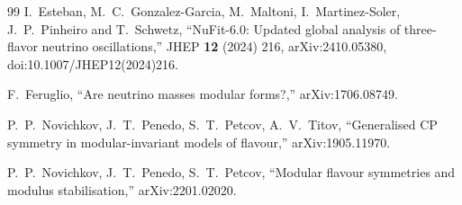 \documentclass[11pt,a4paper]{article}
\theoremstyle{definition}
\begin{document}
\begin{thebibliography}{99}
 I.\ Esteban, M.\ C.\ Gonzalez-Garcia, M.\ Maltoni,
I.\ Martinez-Soler, J.\ P.\ Pinheiro and T.\ Schwetz, ``NuFit-6.0: Updated global
analysis of three-flavor neutrino oscillations,'' JHEP \textbf{12} (2024) 216,
arXiv:2410.05380, doi:10.1007/JHEP12(2024)216.

 F.\ Feruglio, ``Are neutrino masses modular forms?,'' arXiv:1706.08749.

 P.\ P.\ Novichkov, J.\ T.\ Penedo, S.\ T.\ Petcov, A.\ V.\ Titov, ``Generalised CP
symmetry in modular-invariant models of flavour,'' arXiv:1905.11970.

 P.\ P.\ Novichkov, J.\ T.\ Penedo, S.\ T.\ Petcov, ``Modular flavour symmetries and
modulus stabilisation,'' arXiv:2201.02020.

\end{thebibliography}
\end{document}
